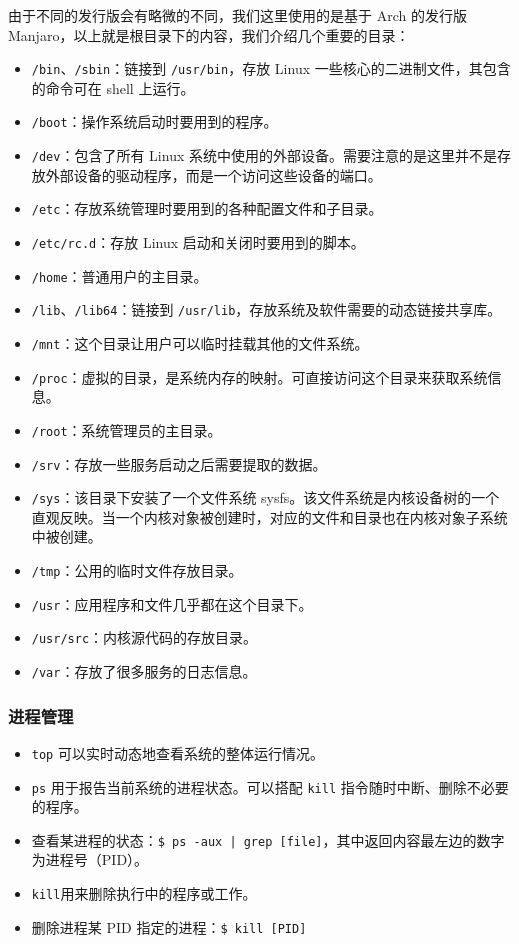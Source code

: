 \indent 由于不同的发行版会有略微的不同，我们这里使用的是基于 Arch 的发行版 Manjaro，以上就是根目录下的内容，我们介绍几个重要的目录：
\begin{itemize}
    \item \verb+/bin+、\verb+/sbin+：链接到 \verb+/usr/bin+，存放 Linux 一些核心的二进制文件，其包含的命令可在 shell 上运行。
    \item \verb+/boot+：操作系统启动时要用到的程序。
    \item \verb+/dev+：包含了所有 Linux 系统中使用的外部设备。需要注意的是这里并不是存放外部设备的驱动程序，而是一个访问这些设备的端口。
    \item \verb+/etc+：存放系统管理时要用到的各种配置文件和子目录。
    \item \verb+/etc/rc.d+：存放 Linux 启动和关闭时要用到的脚本。
    \item \verb+/home+：普通用户的主目录。
    \item \verb+/lib+、\verb+/lib64+：链接到 \verb+/usr/lib+，存放系统及软件需要的动态链接共享库。
    \item \verb+/mnt+：这个目录让用户可以临时挂载其他的文件系统。
    \item \verb+/proc+：虚拟的目录，是系统内存的映射。可直接访问这个目录来获取系统信息。
    \item \verb+/root+：系统管理员的主目录。
    \item \verb+/srv+：存放一些服务启动之后需要提取的数据。
    \item \verb+/sys+：该目录下安装了一个文件系统 sysfs。该文件系统是内核设备树的一个直观反映。当一个内核对象被创建时，对应的文件和目录也在内核对象子系统中被创建。
    \item \verb+/tmp+：公用的临时文件存放目录。
    \item \verb+/usr+：应用程序和文件几乎都在这个目录下。
    \item \verb+/usr/src+：内核源代码的存放目录。
    \item \verb+/var+：存放了很多服务的日志信息。
\end{itemize}

\subsubsection{进程管理}
\indent \setlength{\parindent}{2em}
\begin{itemize}
    \item \verb+top+ 可以实时动态地查看系统的整体运行情况。
    \item \verb+ps+ 用于报告当前系统的进程状态。可以搭配 \verb+kill+ 指令随时中断、删除不必要的程序。
    \item 查看某进程的状态：\verb+$ ps -aux | grep [file]+，其中返回内容最左边的数字为进程号（PID）。
    \item \verb+kill+用来删除执行中的程序或工作。
    \item 删除进程某 PID 指定的进程：\verb+$ kill [PID]+
\end{itemize}


